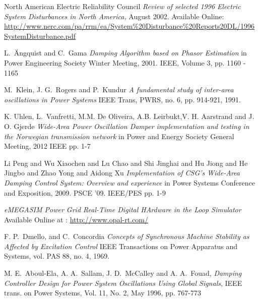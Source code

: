 \documentclass[conference]{IEEEtran}
\begin{document}
%
%
%
\begin{thebibliography}{1}

 North American Electric Reliability Council \emph{Review of selected 1996 Electric System Disturbances in North America,} August 2002. Available Online: \url{http://www.nerc.com/pa/rrm/ea/System\%20Disturbance\%20Reports20DL/1996SystemDisturbance.pdf}

 L.~\"{A}ngquist and C.~Gama  \emph{Damping Algorithm based on Phasor Estimation} in Power Engineering Society Winter Meeting, 2001. IEEE, Volume 3, pp. 1160 - 1165  

M.~Klein, J. G.~Rogers and P.~Kundur \emph{A fundamental study of inter-area oscillations in Power Systems} IEEE Trans, PWRS, no. 6, pp. 914-921, 1991.

 K. Uhlen, L.~Vanfretti, M.M. De Oliveira, A.B. Leirbukt,V. H. Aarstrand and J. O. Gjerde \emph{Wide-Area Power Oscillation Damper implementation and testing in the Norwegian transmission network} in Power and Energy Society General Meeting, 2012 IEEE pp. 1-7

 Li Peng and Wu Xiaochen and Lu Chao and Shi Jinghai and Hu Jiong and He Jingbo and Zhao Yong and Aidong Xu \emph{Implementation of CSG's Wide-Area Damping Control System: Overview and experience} in Power Systems Conference and Exposition, 2009. PSCE '09. IEEE/PES pp. 1-9

 \emph{eMEGASIM Power Grid Real-Time Digital HArdware in the Loop Simulator} Available Online at : \url{http://www.opal-rt.com/}

 F. P.~Dmello, and C.~Concordia \emph{Concepts of Synchronous Machine Stability as Affected by Excitation Control} IEEE Transactions on Power Apparatus and Systems, vol. PAS 88, no. 4, 1969. 
  
  M. E.~Aboul-Ela, A. A.~Sallam, J. D.~McCalley and A. A.~Fouad, \emph{Damping Controller Design for Power System Oscillations Using Global Signals}, IEEE trans. on Power Systems, Vol. 11, No. 2, May 1996, pp. 767-773
  

\end{thebibliography}
\end{document}
